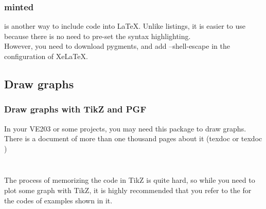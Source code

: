 \begin{frame}[fragile]
	\frametitle{minted}
	 is another way to include code into \LaTeX. Unlike listings, it is easier to use because there is no need to pre-set the syntax highlighting.\\
	However, you need to download \alert{pygments}, and add --shell-escape in the configuration of XeLaTeX.
\end{frame}

\subsection{Draw graphs}

\begin{frame}
	\frametitle{Draw graphs with TikZ and PGF}
	In your VE203 or some projects, you may need this package to draw graphs. There is a document of more than one thousand pages about it (\alert{texdoc}  or \alert{texdoc} )\\
	\begin{multicols}{2}
\inputminted[xleftmargin=1.5em]{latex}{tikz/relation.tex}
	\end{multicols}
\end{frame}

\begin{frame}
	\centering
	
\end{frame}

\begin{frame}[fragile]
	\begin{multicols}{2}
\inputminted[xleftmargin=1.5em]{latex}{tikz/binary_tree.tex}
	\end{multicols}
\end{frame}

\begin{frame}
	\centering
	
\end{frame}

\begin{frame}
The process of memorizing the code in TikZ is quite hard, so while you need to plot some graph with TikZ, it is highly recommended that you refer to the  for the codes of examples shown in it.
\end{frame}